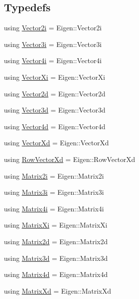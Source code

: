 \subsection*{Typedefs}
\begin{DoxyCompactItemize}
\item 
using \hyperlink{namespaceostk_1_1math_1_1obj_af19f95215c05a66d8f991863fb0e062c}{Vector2i} = Eigen\+::\+Vector2i
\item 
using \hyperlink{namespaceostk_1_1math_1_1obj_a8e5bafdb8928c3fd53af1efa47f3727d}{Vector3i} = Eigen\+::\+Vector3i
\item 
using \hyperlink{namespaceostk_1_1math_1_1obj_a5f75d55c72fdf6221b158406f36eba43}{Vector4i} = Eigen\+::\+Vector4i
\item 
using \hyperlink{namespaceostk_1_1math_1_1obj_a69128b2659fb8f6ff4f927c6e8b87341}{Vector\+Xi} = Eigen\+::\+Vector\+Xi
\item 
using \hyperlink{namespaceostk_1_1math_1_1obj_a5ce374bc225ecfb685da4fed9aa67e6e}{Vector2d} = Eigen\+::\+Vector2d
\item 
using \hyperlink{namespaceostk_1_1math_1_1obj_a18744cbf433bce59f6758d9fe3b1dff1}{Vector3d} = Eigen\+::\+Vector3d
\item 
using \hyperlink{namespaceostk_1_1math_1_1obj_a1eb1eefe1cb56bfc7d2b88d55acfb817}{Vector4d} = Eigen\+::\+Vector4d
\item 
using \hyperlink{namespaceostk_1_1math_1_1obj_a84bdc62967e939556fb94869024693ff}{Vector\+Xd} = Eigen\+::\+Vector\+Xd
\item 
using \hyperlink{namespaceostk_1_1math_1_1obj_a008452f31d2d89206382562dc0180574}{Row\+Vector\+Xd} = Eigen\+::\+Row\+Vector\+Xd
\item 
using \hyperlink{namespaceostk_1_1math_1_1obj_a9c878091175c26e703a4099171cadc5a}{Matrix2i} = Eigen\+::\+Matrix2i
\item 
using \hyperlink{namespaceostk_1_1math_1_1obj_a21413c9f36b149c4bb9cdf407a6c95e7}{Matrix3i} = Eigen\+::\+Matrix3i
\item 
using \hyperlink{namespaceostk_1_1math_1_1obj_aca98b6e5d7e788f61ca7a026bc970de1}{Matrix4i} = Eigen\+::\+Matrix4i
\item 
using \hyperlink{namespaceostk_1_1math_1_1obj_aca824852c53eba10924e5f0fb80cbb87}{Matrix\+Xi} = Eigen\+::\+Matrix\+Xi
\item 
using \hyperlink{namespaceostk_1_1math_1_1obj_ad0ed61f6cb3d96626ef2895a959c8274}{Matrix2d} = Eigen\+::\+Matrix2d
\item 
using \hyperlink{namespaceostk_1_1math_1_1obj_adf5c6ffd20b3822e8686661761213fb1}{Matrix3d} = Eigen\+::\+Matrix3d
\item 
using \hyperlink{namespaceostk_1_1math_1_1obj_a178d5237467762d8b20ed6ed2dd3d096}{Matrix4d} = Eigen\+::\+Matrix4d
\item 
using \hyperlink{namespaceostk_1_1math_1_1obj_a2e17f4d2058bd34d8b17b8ab90980d5e}{Matrix\+Xd} = Eigen\+::\+Matrix\+Xd
\end{DoxyCompactItemize}


